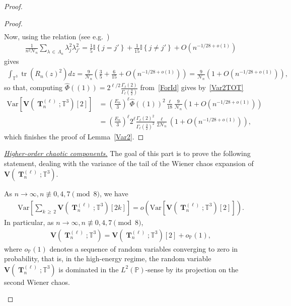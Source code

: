\documentclass[AHL,Unicode,longabstracts,published]{cedram}
\DeclareMathOperator{\bT}{\mathbf{T}}
\DeclareMathOperator{\Tr}{tr}
\newcommand{\bfv}{\mathbf{V}}
\newcommand{\T}{\mathbb{T}^3}
\newcommand{\Prob}{\mathbb{P}}
\newcommand{\V}[1]{\mathrm{Var}{\left[#1\right]}}
\newcommand{\ind}[1]{\mathbb{I}
\left\{#1\right\}}
\newcommand{\notcon}[3]{ {#1} \not\equiv {#2} \pmod {#3} }
\newcommand{\Nn}{\mathcal{N}_n}
\begin{document}
\begin{proof}
\begin{proof}
\begin{align*}
\end{align*}
Now, using the relation (see e.g.~\cite[Appendix~C]{Cam17})
\begin{gather*}
\frac{1}{n^2\Nn}\sum_{\lambda\,\in\,\Lambda_n} \lambda_j^2 \lambda_{j'}^2 = \frac{1}{5}\ind{j=j'} + \frac{1}{15}\ind{j\neq j'} + O\left(n^{-1/28+o(1)}\right)
\end{gather*}
gives
\begin{gather*}
\int_{\T} \Tr\left(R_n(z)^2\right) dz =
\frac{9}{\Nn} \left(\frac{3}{5}+\frac{6}{15} + O\left(n^{-1/28+o(1)}\right)\right)=
\frac{9}{\Nn}\left(1+ O\left(n^{-1/28+o(1)}\right)\right),
\end{gather*}
so that, computing $\widehat{\Phi}((1))=2^{\ell/2}\frac{\Gamma_{\ell}(2)}{\Gamma_{\ell}(\frac{3}{2})}$ from~\eqref{ForId} gives by~\eqref{Var2TOT}
\begin{align*}
\V{\bfv\left(\bT_n^{(\ell)};\T\right)[2]} &= \left(\frac{E_n}{3}\right)^{\ell} \widehat{\Phi}((1))^2
\frac{\ell}{18}\frac{9}{\Nn}\left(1+ O\left(n^{-1/28+o(1)}\right)\right) \\
&=\left(\frac{E_n}{3}\right)^{\ell} 2^{\ell} \frac{\Gamma_{\ell}(2)^2}{\Gamma_{\ell}(\frac{3}{2})^2}
\frac{\ell}{2\Nn}\left(1 + O\left(n^{-1/28+o(1)}\right)\right),
\end{align*}
which finishes the proof of Lemma~\ref{Var2}.
\end{proof}



\noindent\underline{\emph{Higher-order chaotic components.}} The goal of this part is to prove the following statement, dealing with the variance of the tail of the Wiener chaos expansion of $\bfv(\bT_n^{(\ell)};\T)$.

\begin{prop}\label{Higher}
As $n\to \infty,\notcon{n}{0,4,7}{8}$, we have
\begin{gather}\label{Tail}
\V{\sum_{k\,\geq\,2} \bfv \left(\bT_n^{(\ell)}; \T\right)[2k]} = o\left(\V{\bfv\left(\bT_n^{(\ell)};\T\right)[2]}\right).
\end{gather}
In particular, as $ n \to \infty, \notcon{n}{0,4,7}{8}$,
\begin{gather}\label{dom2}
\bfv\left(\bT_n^{(\ell)};\T\right) =
\bfv\left(\bT_n^{(\ell)};\T\right)[2]+o_{\Prob}(1),
\end{gather}
where $o_{\Prob}(1)$ denotes a sequence of random variables converging to zero in probability, that is, in the high-energy regime, the random variable $\bfv(\bT_n^{(\ell)};\T)$ is dominated in the $L^2(\Prob)$-sense by its projection on the second Wiener chaos.
\end{prop}


\end{proof}
\end{document}
